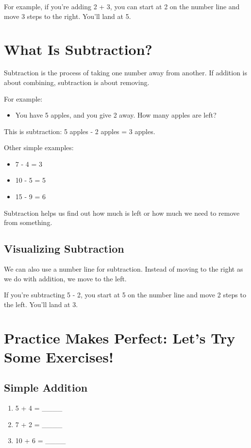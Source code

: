 For example, if you’re adding 2 + 3, you can start at 2 on the number line and move 3 steps to the right. You’ll land at 5.

\section{What Is Subtraction?}
Subtraction is the process of taking one number away from another. If addition is about combining, subtraction is about removing.

For example:
\begin{itemize}
    \item You have 5 apples, and you give 2 away. How many apples are left?
\end{itemize}
This is subtraction: 5 apples - 2 apples = 3 apples.

Other simple examples:
\begin{itemize}
    \item 7 - 4 = 3
    \item 10 - 5 = 5
    \item 15 - 9 = 6
\end{itemize}

Subtraction helps us find out how much is left or how much we need to remove from something.

\subsection{Visualizing Subtraction}
We can also use a number line for subtraction. Instead of moving to the right as we do with addition, we move to the left.

If you’re subtracting 5 - 2, you start at 5 on the number line and move 2 steps to the left. You’ll land at 3.

\section{Practice Makes Perfect: Let’s Try Some Exercises!}
\subsection{Simple Addition}
\begin{enumerate}
    \item 5 + 4 = \_\_\_\_
    \item 7 + 2 = \_\_\_\_
    \item 10 + 6 = \_\_\_\_
\end{enumerate}

